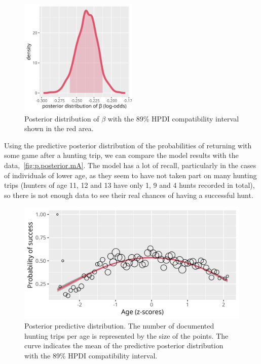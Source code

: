 \documentclass[article, a4paper, 12pt]{memoir}
\begin{document}
\begin{figure}[!hbt]
\begin{center}
    \includegraphics[width=0.5\textwidth]{./plots/b.posterior.mA.png}
\end{center}
\caption{Posterior distribution of $\beta$ with the 89\% HPDI compatibility interval shown in the red area.}\label{fig:b.posterior.mA}
\end{figure}

Using the predictive posterior distribution of the probabilities of returning with some game after a hunting trip, we can compare the model results with the data,~\autoref{fig:p.posterior.mA}.
The model has a lot of recall, particularly in the cases of individuals of lower age, as they seem to have not taken part on many hunting trips (hunters of age 11, 12 and 13 have only 1, 9 and 4 hunts recorded in total), so there is not enough data to see their real chances of having a successful hunt.

\begin{figure}[!htb]
\begin{center}
    \includegraphics[width=\textwidth]{./plots/p.posterior.mA.png}
\end{center}
\caption{Posterior predictive distribution. The number of documented hunting trips per age is represented by the size of the points. The curve indicates the mean of the predictive posterior distribution with the 89\% HPDI compatibility interval.}\label{fig:p.posterior.mA}
\end{figure}
\end{document}
